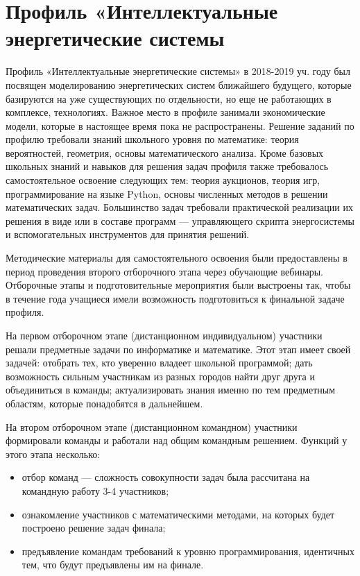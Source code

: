 

\chapter{Профиль «Интеллектуальные энергетические системы}

Профиль «Интеллектуальные энергетические системы» в 2018-2019 уч. году был посвящен моделированию энергетических систем ближайшего будущего, которые базируются на уже существующих по отдельности, но еще не работающих в комплексе, технологиях. Важное место в профиле занимали экономические модели, которые в настоящее время пока не распространены. Решение заданий по профилю требовали знаний школьного уровня по математике: теория вероятностей, геометрия, основы математического анализа. Кроме базовых школьных знаний и навыков для решения задач профиля также требовалось самостоятельное освоение следующих тем: теория аукционов, теория игр, программирование на языке Python, основы численных методов в решении математических задач. Большинство задач требовали практической реализации их решения в виде или в составе программ — управляющего скрипта энергосистемы и вспомогательных инструментов для принятия решений.

Методические материалы для самостоятельного освоения были предоставлены в период проведения второго отборочного этапа через обучающие вебинары. Отборочные этапы и подготовительные мероприятия были выстроены так, чтобы в течение года учащиеся имели возможность подготовиться к финальной задаче профиля.

На первом отборочном этапе (дистанционном индивидуальном) участники решали предметные задачи по информатике и математике. Этот этап имеет своей задачей: отобрать тех, кто уверенно владеет школьной программой; дать возможность сильным участникам из разных городов найти друг друга и объединиться в команды; актуализировать знания именно по тем предметным областям, которые понадобятся в дальнейшем.

На втором отборочном этапе (дистанционном командном) участники формировали команды и работали над общим командным решением. Функций у этого этапа несколько: 
\begin{itemize}
\item отбор команд — сложность совокупности задач была рассчитана на  командную работу 3-4 участников; 
\item ознакомление участников с математическими методами, на которых будет построено решение задач финала; 
\item предъявление командам требований к уровню программирования, идентичных тем, что будут предъявлены им на финале.
\end{itemize}

